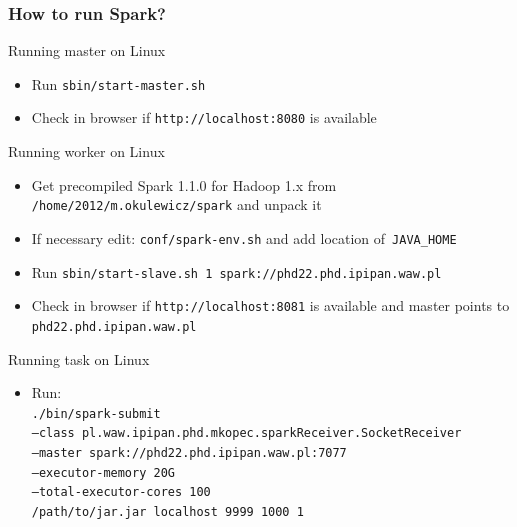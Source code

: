 \documentclass{beamer}
\begin{document}
\begin{frame}[allowframebreaks]
\frametitle{How to run Spark?}

\begin{block}{Running master on Linux}
	\begin{itemize}
		\item Run \texttt{sbin/start-master.sh}
		\item Check in browser if \texttt{http://localhost:8080} is available
	\end{itemize}
\end{block}

\begin{block}{Running worker on Linux}
	\begin{itemize}
		\item Get precompiled Spark 1.1.0 for Hadoop 1.x from \texttt{/home/2012/m.okulewicz/spark} and unpack it
		\item If necessary edit: \texttt{conf/spark-env.sh} and add location of~\texttt{JAVA\_HOME}
		\item Run \texttt{sbin/start-slave.sh 1 spark://phd22.phd.ipipan.waw.pl}
		\item Check in browser if \texttt{http://localhost:8081} is available and master points to \texttt{phd22.phd.ipipan.waw.pl}
	\end{itemize}
\end{block}
	
\begin{block}{Running task on Linux}
	\begin{itemize}
		\item Run: \\
		\texttt{./bin/spark-submit \\
  --class pl.waw.ipipan.phd.mkopec.sparkReceiver.SocketReceiver \\
  --master spark://phd22.phd.ipipan.waw.pl:7077 \\
  --executor-memory 20G \\
  --total-executor-cores 100 \\
  /path/to/jar.jar localhost 9999 1000 1}
	\end{itemize}
\end{block}

\end{frame}

\end{document}
